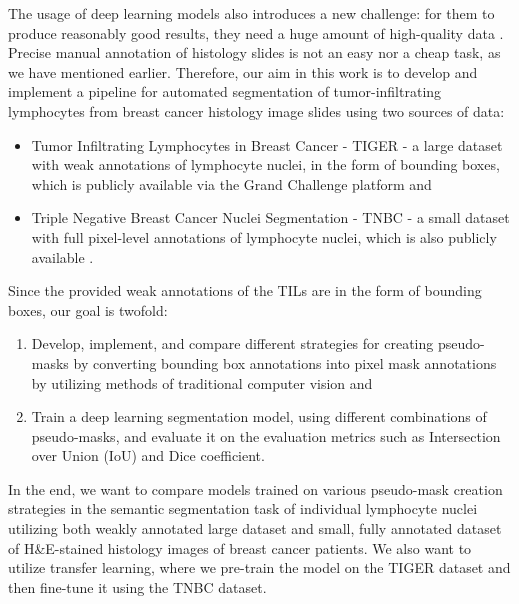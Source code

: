 The usage of deep learning models also introduces a new challenge: for them to produce reasonably good results, they need a huge amount of high-quality data \cite{Santosh2022-3}. Precise manual annotation of histology slides is not an easy nor a cheap task, as we have mentioned earlier. Therefore, our aim in this work is to develop and implement a pipeline for automated segmentation of tumor-infiltrating lymphocytes from breast cancer histology image slides using two sources of data:

\begin{itemize}
    \item Tumor Infiltrating Lymphocytes in Breast Cancer - TIGER - a large dataset with weak annotations of lymphocyte nuclei, in the form of bounding boxes, which is publicly available via the Grand Challenge platform \cite{tiger_dataset} and
    \item Triple Negative Breast Cancer Nuclei Segmentation - TNBC - a small dataset with full pixel-level annotations of lymphocyte nuclei, which is also publicly available \cite{TNBC-nuclei-seg}.
\end{itemize}

Since the provided weak annotations of the TILs are in the form of bounding boxes, our goal is twofold:

\begin{enumerate}
 \item Develop, implement, and compare different strategies for creating pseudo-masks by converting bounding box annotations into pixel mask annotations by utilizing methods of traditional computer vision and
 \item Train a deep learning segmentation model, using different combinations of pseudo-masks, and evaluate it on the evaluation metrics such as Intersection over Union (IoU) and Dice coefficient.
\end{enumerate}

In the end, we want to compare models trained on various pseudo-mask creation strategies in the semantic segmentation task of individual lymphocyte nuclei utilizing both weakly annotated large dataset and small, fully annotated dataset of H\&E-stained histology images of breast cancer patients. We also want to utilize transfer learning, where we pre-train the model on the TIGER dataset and then fine-tune it using the TNBC dataset.



